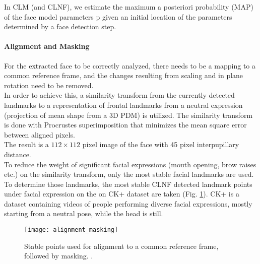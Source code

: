 
In CLM (and CLNF), we estimate the maximum a posteriori probability (MAP) of the face model parameters p given an initial location of the parameters determined by a face detection step.

\paragraph{Alignment and Masking}
For the extracted face to be correctly analyzed, there needs to be a mapping to a common reference frame, and the changes resulting from scaling and in plane rotation need to be removed. \\
In order to achieve this, a similarity transform from the currently detected landmarks to a representation of frontal landmarks from a neutral expression (projection of mean shape from a 3D PDM) is utilized. The similarity transform is done with Procrustes superimposition that minimizes the mean square error between aligned pixels.\\
The result is a $112 \times 112$ pixel image of the face with 45 pixel interpupillary distance. \\
To reduce the weight of significant facial expressions (mouth opening, brow raises etc.) on the similarity transform, only the most stable facial landmarks are used. \\
To determine those landmarks, the most stable CLNF detected landmark points under facial expression on the on CK+ dataset \cite{CK+} are taken (Fig. \ref{fig:alignment_masking}). CK+ is a dataset containing videos of people performing diverse facial expressions, mostly starting from a neutral pose, while the head is still.

\begin{figure}[H]
	\centering
	\texttt{[image: alignment\_masking]}
	\caption{Stable points used for alignment to a common reference frame, followed by masking. \cite{Baltru2015}.}
	\label{fig:alignment_masking}
\end{figure}

